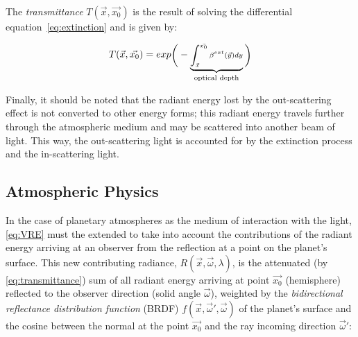 \documentclass[journal]{vgtc}                %
\begin{document}
The \textit{transmittance} $T(\vec{x}, \vec{x_0})$ is the result of solving the differential equation~\ref{eq:extinction} and is given by:

\vspace*{-2.5mm}
\begin{equation}\label{eq:transmittance}
\small
T(\vec{x}, \vec{x_0}) = exp\Bigg(-\underbrace{\int_{\vec{x}}^{\vec{x_0}}{\beta^{ext}(\vec{y})dy}}_{\text{optical depth}}\Bigg)
\end{equation} 
\vspace*{-1.5mm}

Finally, it should be noted that the radiant energy lost by the out-scattering effect is not converted to other energy forms; this radiant energy travels further through the atmospheric medium and may be scattered into another beam of light. This way, the out-scattering light is accounted for by the extinction process and the in-scattering light.


\subsection{Atmospheric Physics}\label{sec:atmPhysics}

 
In the case of planetary atmospheres as the medium of interaction with the light, \autoref{eq:VRE} must the extended to take into account the contributions of the radiant energy arriving at an observer from the reflection at a point on the planet's surface. This new contributing radiance, $R(\vec{x}, \vec{\omega}, \lambda)$, is the attenuated (by \autoref{eq:transmittance}) sum of all radiant energy arriving at point $\vec{x_0}$ (hemisphere) reflected to the observer direction (solid angle $\vec{\omega}$), weighted by the \textit{bidirectional reflectance distribution function} (BRDF) $f(\vec{x}, \vec{\omega}', \vec{\omega})$ of the planet's surface and the cosine between the normal at the point $\vec{x_0}$ and the ray incoming direction $\vec{\omega}'$:
\end{document}
